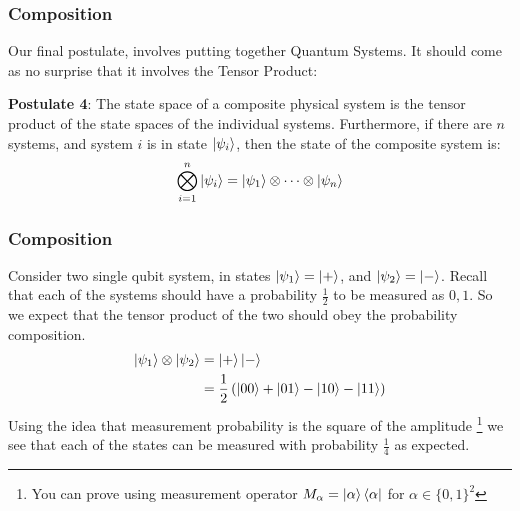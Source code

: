 \documentclass{beamer}
\begin{document}
\begin{frame}
    \frametitle{Composition}
    Our final postulate, involves putting together Quantum Systems.
    It should come as no surprise that it involves the Tensor Product:
    \begin{definition}
        \textbf{Postulate 4}: The state space of a composite physical system is the tensor
        product of the state spaces of the individual systems. Furthermore,
        if there are $n$ systems, and system $i$ is in state $\ket{\psi_i}$,
        then the state of the composite system is:
        \begin{equation}
            \bigotimes_{i=1}^n \ket{\psi_i} = \ket{\psi_1} \otimes\dots \otimes \ket{\psi_n}
        \end{equation}
    \end{definition}
\end{frame}
\begin{frame}
    \frametitle{Composition}
    \begin{example}
        Consider two single qubit system, in states $\ket{\psi_1} = \ket{+}$, and $\ket{\psi_2} =\ket{-}$.
        Recall that each of the systems should have a probability $\frac{1}{2}$ to be measured as $0, 1$.
        So we expect that the tensor product of the two should obey the probability composition.
        \begin{align}
            \ket{\psi_1} \otimes \ket{\psi_2} & = \ket{+}\ket{-}                                                     \\
                                              & = \frac{1}{2}\left(\ket{00} + \ket{01} - \ket{10} - \ket{11} \right)
        \end{align}
        Using the idea that measurement probability is the square of the amplitude
        \footnote{You can prove using measurement operator $M_\alpha = \ket{\alpha}\bra{\alpha}$ for $\alpha \in \{0, 1\}^2$}
        we see that each of the states can be measured with probability $\frac{1}{4}$ as expected.
    \end{example}
\end{frame}
\end{document}
